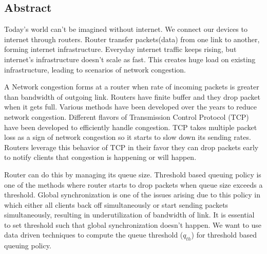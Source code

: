 \begin{flushright}
\huge{\section*{Abstract}}
\end{flushright}
Today's world can't be imagined without internet. We connect our devices to internet through routers. Router transfer packets(data) from one link to another, forming internet infrastructure. Everyday internet traffic keeps rising, but internet's infrastructure doesn't scale as fast. This creates huge load on existing infrastructure, leading to scenarios of network congestion. 

A Network congestion forms at a router when rate of incoming packets is greater than bandwidth of outgoing link. Routers have finite buffer and they drop packet when it gets full. Various methods have been developed over the years to reduce network congestion. Different flavors of Transmission Control Protocol (TCP) have been developed to efficiently handle congestion. TCP takes multiple packet loss as a sign of network congestion so it starts to slow down its sending rates. Routers leverage this behavior of TCP in their favor they can drop packets early to notify clients that congestion is happening or will happen. 

Router can do this by managing its queue size. Threshold based queuing policy is one of the methods where router starts to drop packets when queue size exceeds a threshold. Global synchronization is one of the issues arising due to this policy in which either all clients back off simultaneously or start sending packets simultaneously, resulting in underutilization of bandwidth of link. It is essential to set threshold such that global synchronization doesn't happen. We want to use data driven techniques to compute the queue threshold ($ q_{th} $) for threshold based queuing policy. 
